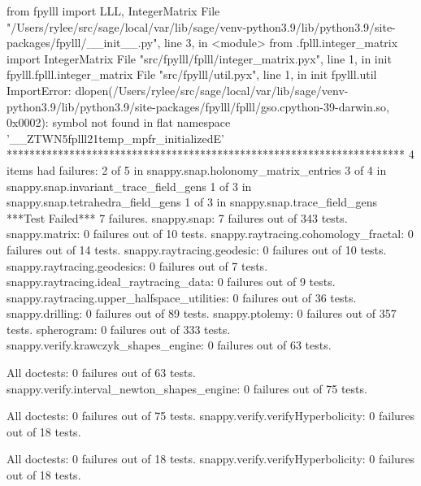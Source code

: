         from fpylll import LLL, IntegerMatrix
      File "/Users/rylee/src/sage/local/var/lib/sage/venv-python3.9/lib/python3.9/site-packages/fpylll/__init__.py", line 3, in <module>
        from .fplll.integer_matrix import IntegerMatrix
      File "src/fpylll/fplll/integer_matrix.pyx", line 1, in init fpylll.fplll.integer_matrix
      File "src/fpylll/util.pyx", line 1, in init fpylll.util
    ImportError: dlopen(/Users/rylee/src/sage/local/var/lib/sage/venv-python3.9/lib/python3.9/site-packages/fpylll/fplll/gso.cpython-39-darwin.so, 0x0002): symbol not found in flat namespace '__ZTWN5fplll21temp_mpfr_initializedE'
**********************************************************************
4 items had failures:
   2 of   5 in snappy.snap.holonomy_matrix_entries
   3 of   4 in snappy.snap.invariant_trace_field_gens
   1 of   3 in snappy.snap.tetrahedra_field_gens
   1 of   3 in snappy.snap.trace_field_gens
***Test Failed*** 7 failures.
snappy.snap:
   7 failures out of 343 tests.
snappy.matrix:
   0 failures out of 10 tests.
snappy.raytracing.cohomology_fractal:
   0 failures out of 14 tests.
snappy.raytracing.geodesic:
   0 failures out of 10 tests.
snappy.raytracing.geodesics:
   0 failures out of 7 tests.
snappy.raytracing.ideal_raytracing_data:
   0 failures out of 9 tests.
snappy.raytracing.upper_halfspace_utilities:
   0 failures out of 36 tests.
snappy.drilling:
   0 failures out of 89 tests.
snappy.ptolemy:
   0 failures out of 357 tests.
spherogram:
   0 failures out of 333 tests.
snappy.verify.krawczyk_shapes_engine:
   0 failures out of 63 tests.

All doctests:
   0 failures out of 63 tests.
snappy.verify.interval_newton_shapes_engine:
   0 failures out of 75 tests.

All doctests:
   0 failures out of 75 tests.
snappy.verify.verifyHyperbolicity:
   0 failures out of 18 tests.

All doctests:
   0 failures out of 18 tests.
snappy.verify.verifyHyperbolicity:
   0 failures out of 18 tests.

